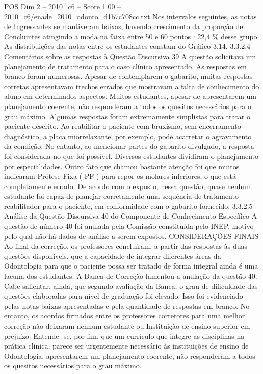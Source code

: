 \begin{textsample}{POS Dim 2 – 2010\_c6 – Score 1.00 – 2010\_c6/enade\_2010\_odonto\_d1b7c708cc.txt}
Nos intervalos seguintes, as notas de Ingressantes se mantiveram baixas, havendo crescimento da proporção de Concluintes atingindo a moda na faixa entre 50 e 60 pontos : 22,4 \% desse grupo.
As distribuições das notas entre os estudantes constam do Gráfico 3.14. 3.3.2.4 Comentários sobre as respostas à Questão Discursiva 39 A questão solicitava um planejamento de tratamento para o caso clínico apresentado.
As respostas em branco foram numerosas.
Apesar de contemplarem o gabarito, muitas respostas corretas apresentavam trechos errados que mostravam a falta de conhecimento do aluno em determinados aspectos.
Muitos estudantes, apesar de apresentarem um planejamento coerente, não responderam a todos os quesitos necessários para o grau máximo.
Algumas respostas foram extremamente simplistas para tratar o paciente descrito.
Ao reabilitar o paciente com bruxismo, sem encerramento diagnóstico, a placa miorrelaxante, por exemplo, pode acarretar o agravamento da condição.
No entanto, ao mencionar partes do gabarito divulgado, a resposta foi considerada no que foi possível.
Diversos estudantes dividiram o planejamento por especialidades.
Outro fato que chamou bastante atenção foi que muitos indicaram Prótese Fixa ( PF ) para repor os molares inferiores, o que está completamente errado.
De acordo com o exposto, nessa questão, quase nenhum estudante foi capaz de planejar corretamente uma sequência de tratamento reabilitador para o paciente, em conformidade com o gabarito fornecido. 3.3.2.5 Análise da Questão Discursiva 40 do Componente de Conhecimento Específico A questão de número 40 foi anulada pela Comissão constituída pelo INEP, motivo pelo qual não há dados de análise a serem expostos.
CONSIDERAÇÕES FINAIS Ao final da correção, os professores concluíram, a partir das respostas às duas questões disponíveis, que a capacidade de integrar diferentes áreas da Odontologia para que o paciente possa ser tratado de forma integral ainda é uma lacuna dos estudantes.
A Banca de Correção lamentou a anulação da questão 40.
Cabe salientar, ainda, que segundo avaliação da Banca, o grau de dificuldade das questões elaboradas para nível de graduação foi elevado.
Isso foi evidenciado pelas notas baixas apresentadas e pela quantidade de respostas em branco.
No entanto, os acordos firmados entre os professores corretores para uma melhor correção não deixaram nenhum estudante ou Instituição de ensino superior em prejuízo.
Entende -se, por fim, que um currículo que integre as disciplinas na prática clínica, parece ser urgentemente necessário às instituições de ensino de Odontologia. apresentarem um planejamento coerente, não responderam a todos os quesitos necessários para o grau máximo.

\end{textsample}
